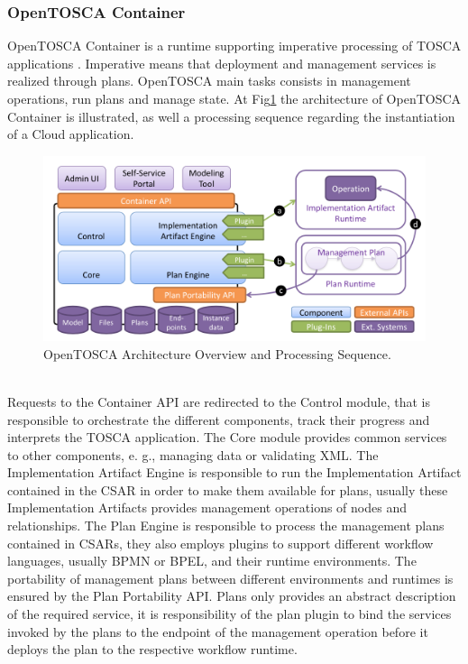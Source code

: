 \subsubsection{OpenTOSCA Container}
\label{subs:OpenTOSCA Container}
OpenTOSCA Container is a runtime supporting imperative processing of TOSCA applications \cite{OpenTOSCA}. Imperative means that deployment and management services is realized through plans.
OpenTOSCA main tasks consists in management operations, run plans and manage state. At Fig\ref{fig:open_container} the architecture of OpenTOSCA Container is illustrated, as well
a processing sequence regarding the instantiation of a Cloud application.
\begin{figure}[h!]
  \centering
  \includegraphics[width=\textwidth]{images/open_container}
  \caption{OpenTOSCA Architecture Overview and Processing Sequence.}
  \label{fig:open_container}
\end{figure}\\
Requests to the Container API are redirected to the Control module, that is responsible to orchestrate the different components, track their progress and interprets the TOSCA application.
The Core module provides common services to other components, e. g., managing data or validating XML. The Implementation Artifact Engine is responsible to run the Implementation Artifact
contained in the CSAR in order to make them available for plans, usually these Implementation Artifacts provides management operations of nodes and relationships. The Plan Engine is responsible
to process the management plans contained in CSARs, they also employs plugins to support different workflow languages, usually BPMN or BPEL, and their runtime environments. The portability of
management plans between different environments and runtimes is ensured by the Plan Portability API. Plans only provides an abstract description of the required service, it is responsibility of
the plan plugin to bind the services invoked by the plans to the endpoint of the management operation before it deploys the plan to the respective workflow runtime.
